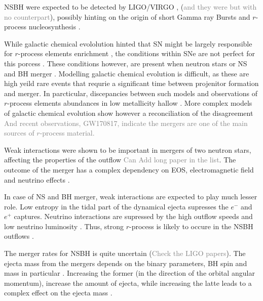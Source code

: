 \documentclass[11pt,a4paper,headinclude=true,DIV=14,BCOR=8mm,chapterprefix,listof=totoc,twoside,openright,abstracton]{scrbook}
\newcommand{\gray}[1]{\textcolor{gray}{#1}}
\begin{document}
NSBH were expected to be detected by LIGO/VIRGO \cite{LIGO Scientific Collaboration et al., 2015; Acernese et al., 2015}, (\gray{and they were but with no counterpart}), possibly hinting on the origin of short Gamma ray Bursts \cite{e.g. Lee and Ramirez-Ruiz, 2007} and $r$-process nucleosynthesis \cite{(e.g. Lattimer and Schramm, 1976; Korobkin et al., 2012; Bauswein et al., 2014b}.

While galactic chemical evololution hinted that SN might be largely responsible for $r$-process elements enrichment \cite{e.g. Qian, 2000; Argast et al., 2004}, the conditions within SNe are not perfect for this porcess \cite{e.g. Arcones and Thielemann, 2013)}. These conditions however, are present when neutron stars or NS and BH merger \cite{Freiburghaus et al., 1999}. Modelling galactic chemical evolution is difficult, as these are high yeild rare events that requrie a significant time between projenitor formation and merger. In parcticular, discepancies between such models and observations of $r$-process elements abundances in low metallicity hallow \cite{Qian, 2000; Argast et al., 2004}. More complex models of galactic chemical evolution show however a reconciliation of the disagreement \cite{Matteucci et al., 2014; Shen et al., 2015; van de Voort et al., 2015; Ishimaru et al., 2015} \gray{And recent observations, GW170817, indicate the mergers are one of the main sources of $r$-process material.}

Weak interactions were shown to be important in mergers of two neutron stars, affecting the properties of the outflow \cite{Wanajo et al., 2014; Goriely et al., 2015; Sekiguchi et al., 2015; Foucart et al., 2016a; Palenzuela et al., 2015; Radice et al., 2016} \gray{Can Add long paper in the list}. The outcome of the merger has a complex dependency on EOS, electromagnetic field and neutrino effects \cite{e.g., Neilsen et al., 2014; Palenzuela et al., 2015}. 

In case of NS and BH merger, weak interactions are expected to play much lesser role. Low entropy in the tidal part of the dynamical ejecta supresses the $e^{-}$ and $e^{+}$ captures. Neutrino interactions are supressed by the high outflow speeds and low neutrino luminosity \cite{e.g., Foucart et al., 2014, 2015}. Thus, strong $r$-process is likely to occure in the NSBH outflows \cite{Lattimer and Schramm, 1976; Lattimer et al., 1977; Korobkin et al., 2012; Bauswein et al., 2014a}.

The merger rates for NSBH is quite uncertain (\gray{Check the LIGO papers}). The ejecta mass from the mergers depends on the binary parameters, BH spin and mass in particular \cite{Foucart et al., 2013; Hotokezaka et al., 2013c; Bauswein et al., 2014a; Kyutoku et al., 2015}. Increasing the former (in the direction of the orbital angular momentum), increase the amount of ejecta, while increasing the latte leads to a complex effect on the ejecta mass \cite{Kyutoku et al., 2015}.
\end{document}

